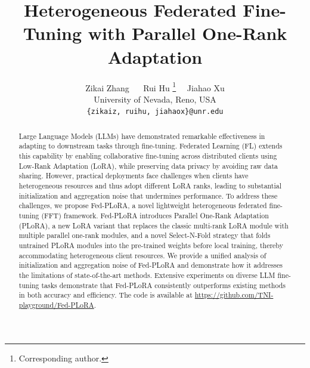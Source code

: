 \documentclass{article} %
\title{Heterogeneous Federated Fine-Tuning with Parallel One-Rank Adaptation}
\author{Zikai Zhang ~~
Rui Hu \thanks{Corresponding author.}~~ 
Jiahao Xu\\
University of Nevada, Reno, USA\\
{\tt \{zikaiz, ruihu, jiahaox\}@unr.edu}
}
\begin{document}
\maketitle

\begin{abstract}

Large Language Models (LLMs) have demonstrated remarkable effectiveness in adapting to downstream tasks through fine-tuning. Federated Learning (FL) extends this capability by enabling collaborative fine-tuning across distributed clients using Low-Rank Adaptation (LoRA), while preserving data privacy by avoiding raw data sharing. However, practical deployments face challenges when clients have heterogeneous resources and thus adopt different LoRA ranks, leading to substantial initialization and aggregation noise that undermines performance. 
% 
To address these challenges, we propose Fed-PLoRA, a novel lightweight heterogeneous federated fine-tuning (FFT) framework. Fed-PLoRA introduces Parallel One-Rank Adaptation (PLoRA), a new LoRA variant that replaces the classic multi-rank LoRA module with multiple parallel one-rank modules, and a novel Select-N-Fold strategy that folds untrained PLoRA modules into the pre-trained weights before local training, thereby accommodating heterogeneous client resources. We provide a unified analysis of initialization and aggregation noise of Fed-PLoRA and demonstrate how it addresses the limitations of state-of-the-art methods. Extensive experiments on diverse LLM fine-tuning tasks demonstrate that Fed-PLoRA consistently outperforms existing methods in both accuracy and efficiency. The code is available at \url{https://github.com/TNI-playground/Fed-PLoRA}.

\end{abstract}
\end{document}
